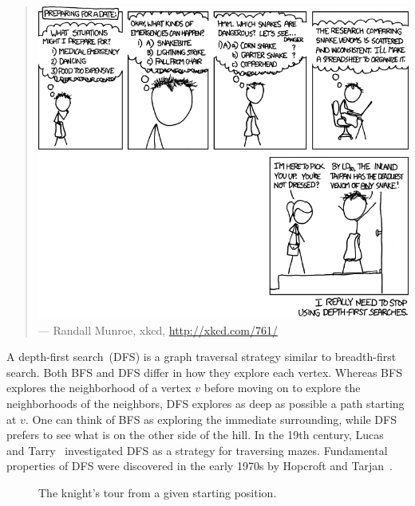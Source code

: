\begin{quote}
\includegraphics[scale=0.5]{image/graph-algorithms/depth-first-search} \\
\noindent
--- Randall Munroe, xkcd,
\url{http://xkcd.com/761/}
\end{quote}

\noindent
A depth-first search~(DFS) is a
graph traversal strategy similar to breadth-first
search. Both BFS and
DFS differ in how they explore each vertex. Whereas
BFS explores the neighborhood of a vertex $v$ before moving
on to explore the neighborhoods of the neighbors, DFS
explores as deep as possible a path starting at $v$. One can think of
BFS as exploring the immediate surrounding, while
DFS prefers to see what is on the other side of the
hill. In the 19th century,
Lucas~\cite{Lucas1882.1894} and
Tarry~\cite{Tarry1895} investigated
DFS as a strategy for traversing
mazes. Fundamental properties of DFS were
discovered in the early 1970s by
Hopcroft and
Tarjan~\cite{HopcroftTarjan1973,Tarjan1972}.

\begin{figure}[!htbp]
\centering
{}

\caption{The knight's tour from a given starting position.}
\label{fig:graph_algorithms:one_knight_tour}
\end{figure}

